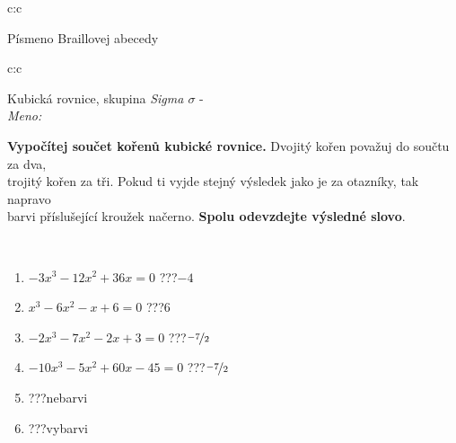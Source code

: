 \documentclass[10pt]{report}
\begin{document}
\begin{tabular}{c:c}
\begin{minipage}[c][104.5mm][t]{0.5\linewidth}
\begin{center}
\begin{minipage}{0.20\linewidth}
\begin{center}
{\small Písmeno Braillovej abecedy}
\end{center}
\end{minipage}
\end{center}
\end{minipage}
%
\end{tabular}
\newpage
\thispagestyle{empty}
\begin{tabular}{c:c}
\begin{minipage}[c][104.5mm][t]{0.5\linewidth}
\begin{center}
\vspace{7mm}
{\huge Kubická rovnice, skupina \textit{Sigma $\sigma$} -}\\[5mm]
\textit{Meno:}\phantom{xxxxxxxxxxxxxxxxxxxxxxxxxxxxxxxxxxxxxxxxxxxxxxxxxxxxxxxxxxxxxxxxx}\\[5mm]
\begin{minipage}{0.95\linewidth}
\textbf{Vypočítej součet kořenů kubické rovnice.} Dvojitý kořen považuj do součtu za dva,\\trojitý kořen za tři. Pokud ti vyjde stejný výsledek jako je za otazníky, tak napravo\\barvi příslušející kroužek načerno. \textbf{Spolu odevzdejte výsledné slovo}.
\end{minipage}
\\[1mm]
\begin{minipage}{0.79\linewidth}
\begin{center}
\begin{varwidth}{\linewidth}
\begin{enumerate}
\Large
\item $-3x^3-12x^2+36x=0$\quad \dotfill\; ???\;\dotfill \quad $-4$
\item $x^3-6x^2-x+6=0$\quad \dotfill\; ???\;\dotfill \quad $6$
\item $-2x^3-7x^2-2x+3=0$\quad \dotfill\; ???\;\dotfill \quad $\nicefrac{-7}{2}$
\item $-10x^3-5x^2+60x-45=0$\quad \dotfill\; ???\;\dotfill \quad $\nicefrac{-7}{2}$
\item \quad \dotfill\; ???\;\dotfill \quad nebarvi
\item \quad \dotfill\; ???\;\dotfill \quad vybarvi
\end{enumerate}
\end{varwidth}
\end{center}
\end{minipage}
\begin{minipage}{0.20\linewidth}
\begin{center}

\end{center}
\end{minipage}
\end{center}
\end{minipage}
\end{tabular}
\end{document}
